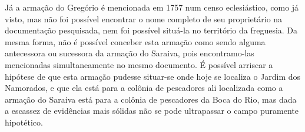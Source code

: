 Já a armação do Gregório é mencionada em 1757 num censo eclesiástico, como já visto, mas não foi possível encontrar o nome completo de seu proprietário na documentação pesquisada, nem foi possível situá-la no território da freguesia. Da mesma forma, não é possível conceber esta armação como sendo alguma antecessora ou sucessora da armação do Saraiva, pois encontramo-las mencionadas simultaneamente no mesmo documento. É possível arriscar a hipótese de que esta armação pudesse situar-se onde hoje se localiza o Jardim dos Namorados, e que ela está para a colônia de pescadores ali localizada como a armação do Saraiva está para a colônia de pescadores da Boca do Rio, mas dada a escassez de evidências mais sólidas não se pode ultrapassar o campo puramente hipotético.
